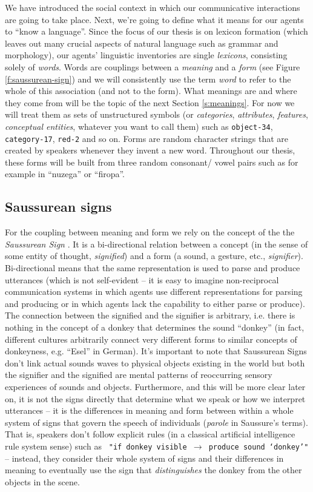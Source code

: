 We have introduced the social context in which our communicative
interactions are going to take place. Next, we're going to define what
it means for our agents to ``know a language''. Since the focus of our
thesis is on lexicon formation (which leaves out many crucial aspects
of natural language such as grammar and morphology), our agents'
linguistic inventories are single \emph{lexicons}, consisting solely
of \emph{words}. Words are couplings between a \emph{meaning} and a
\emph{form} (see Figure \ref{f:saussurean-sign}) and we will
consistently use the term \emph{word} to refer to the whole of this
association (and not to the form). What meanings are and where they
come from will be the topic of the next Section \ref{s:meanings}. For
now we will treat them as sets of unstructured symbols (or
\emph{categories}, \emph{attributes}, \emph{features},
\emph{conceptual entities}, whatever you want to call them) such as
{\tt object-34}, {\tt category-17}, {\tt red-2} and so on. Forms are
random character strings that are created by speakers whenever they
invent a new word. Throughout our thesis, these forms will be built
from three random consonant/ vowel pairs such as for example in
``nuzega'' or ``firopa''.


\subsection{Saussurean signs}
\label{s:saussurean-signs}

For the coupling between meaning and form we rely on the concept of
the the \emph{Saussurean Sign} \citep{saussure67cours}. It is a
bi-directional relation between a concept (in the sense of some entity
of thought, \emph{signified}) and a form (a sound, a gesture, etc.,
\emph{signifier}). Bi-directional means that the same representation
is used to parse and produce utterances (which is not self-evident --
it is easy to imagine non-reciprocal communication systems in which
agents use different representations for parsing and producing or in
which agents lack the capability to either parse or produce). The
connection between the signified and the signifier is arbitrary, i.e.
there is nothing in the concept of a donkey that determines the sound
``donkey'' (in fact, different cultures arbitrarily connect very
different forms to similar concepts of donkeyness, e.g. ``Esel'' in
German). It's important to note that Saussurean Signs don't link
actual sounds waves to physical objects existing in the world but both
the signifier and the signified are mental patterns of reoccurring
sensory experiences of sounds and objects. Furthermore, and this will
be more clear later on, it is not the signs directly that determine
what we speak or how we interpret utterances -- it is the differences
in meaning and form between within a whole system of signs that govern
the speech of individuals (\emph{parole} in Saussure's terms). That
is, speakers don't follow explicit rules (in a classical artificial
intelligence rule system sense) such as {\tt \ "if donkey visible
  $\rightarrow$ produce sound `donkey'"} -- instead, they consider
their whole system of signs and their differences in meaning to
eventually use the sign that \emph{distinguishes} the donkey from
the other objects in the scene.

